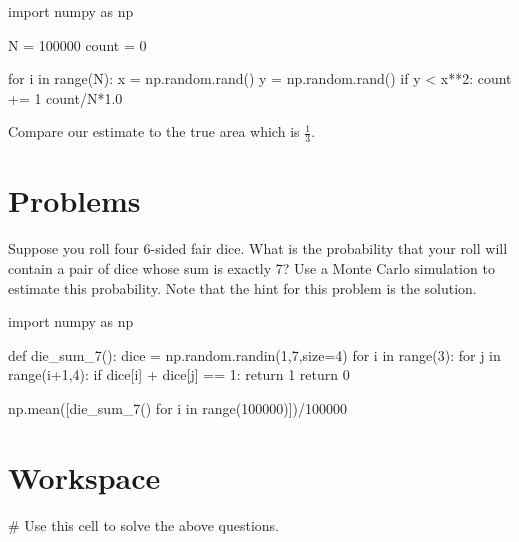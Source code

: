 \documentclass{ximera}
\begin{document}
\begin{sageCell}
import numpy as np

N = 100000
count = 0

for i in range(N):
        x = np.random.rand()
        y = np.random.rand()
        if y < x**2:
                count += 1
count/N*1.0
\end{sageCell}

Compare our estimate to the true area which is $\frac{1}{3}$.

\section{Problems}

\begin{question}
Suppose you roll four 6-sided fair dice. What is the probability that your roll will contain a pair of dice whose sum is exactly 7? Use a Monte Carlo simulation to estimate this probability. Note that the hint for this problem is the solution.

\begin{hint}
	\begin{sageCell}
import numpy as np

def die_sum_7():
        dice = np.random.randin(1,7,size=4)
        for i in range(3):
                for j in range(i+1,4):
                        if dice[i] + dice[j] == 1: 
                               return 1
        return 0

np.mean([die_sum_7() for i in range(100000)])/100000
	\end{sageCell}
\end{hint}

\end{question}

\begin{question}

\end{question}

\begin{question}

\end{question}

\section{Workspace}

\begin{sageCell}
# Use this cell to solve the above questions.
\end{sageCell}
\end{document}
